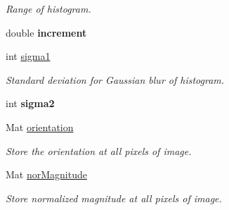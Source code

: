 \begin{DoxyCompactItemize}
\begin{DoxyCompactList}\small\item\em \-Range of histogram. \end{DoxyCompactList}\item 
\hypertarget{classDescriptor_a173fd2cc85cc2711aea3a32d587c1251}{double {\bfseries increment}}\label{classDescriptor_a173fd2cc85cc2711aea3a32d587c1251}

\item 
\hypertarget{classDescriptor_a58836366bc5c421435fcfbde81879eee}{int \hyperlink{classDescriptor_a58836366bc5c421435fcfbde81879eee}{sigma1}}\label{classDescriptor_a58836366bc5c421435fcfbde81879eee}

\begin{DoxyCompactList}\small\item\em \-Standard deviation for \-Gaussian blur of histogram. \end{DoxyCompactList}\item 
\hypertarget{classDescriptor_a96aea1288aa39d193855997eefeb80d8}{int {\bfseries sigma2}}\label{classDescriptor_a96aea1288aa39d193855997eefeb80d8}

\item 
\hypertarget{classDescriptor_ac46c03a8dabd30d59473c16b76751204}{\-Mat \hyperlink{classDescriptor_ac46c03a8dabd30d59473c16b76751204}{orientation}}\label{classDescriptor_ac46c03a8dabd30d59473c16b76751204}

\begin{DoxyCompactList}\small\item\em \-Store the orientation at all pixels of image. \end{DoxyCompactList}\item 
\hypertarget{classDescriptor_a6ef50df18ee1af2ae4f54b573b5c89c0}{\-Mat \hyperlink{classDescriptor_a6ef50df18ee1af2ae4f54b573b5c89c0}{nor\-Magnitude}}\label{classDescriptor_a6ef50df18ee1af2ae4f54b573b5c89c0}

\begin{DoxyCompactList}\small\item\em \-Store normalized magnitude at all pixels of image. \end{DoxyCompactList}\end{DoxyCompactItemize}


